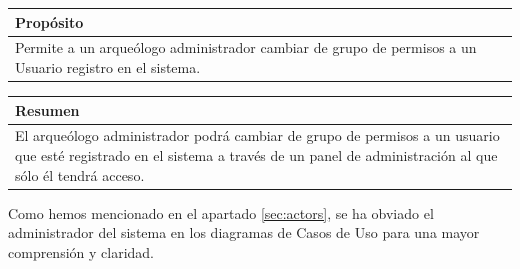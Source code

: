     \begin{table}[H]
        \centering
        \begin{tabularx}{\textwidth}{@{} |L |@{}} \hline
            \textbf{Propósito} \\
            \hline
            Permite a un arqueólogo administrador cambiar de grupo de permisos a un Usuario
            registro en el sistema. \\
            \hline
        \end{tabularx}
    \end{table}

    \begin{table}[H]
        \centering
        \begin{tabularx}{\textwidth}{@{} |L |@{}} \hline
            \textbf{Resumen} \\
            \hline
            El arqueólogo administrador podrá cambiar de grupo de permisos a un usuario que esté
            registrado en el sistema a través de un panel de administración al que sólo él tendrá
            acceso. \\
            \hline
        \end{tabularx}
    \end{table}

Como hemos mencionado en el apartado \ref{sec:actors}, se ha obviado el administrador del
sistema en los diagramas de Casos de Uso para una mayor comprensión y claridad.
